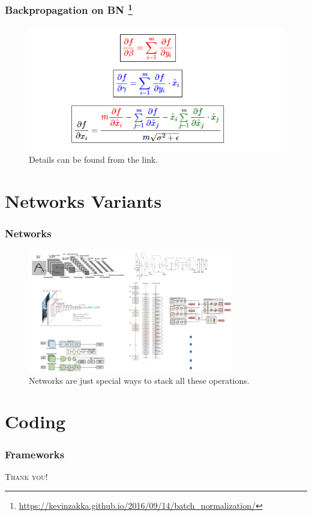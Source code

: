 \documentclass[10pt]{beamer}
\begin{document}
\begin{frame}
\frametitle{Backpropagation on BN \footnote{\url{https://kevinzakka.github.io/2016/09/14/batch_normalization/}}}
\begin{figure}[H]
	\centerline{
		\includegraphics[width=1\textwidth]{back_bn_2.png}
	}
\caption{Details can be found from the link.}
\end{figure}
\end{frame}















\section{Networks Variants}
\begin{frame}
\frametitle{Networks}
	\begin{figure}[H]
	\centerline{
		\includegraphics[width=0.8\textwidth]{networks.png}
	}
	\caption{Networks are just special ways to stack all these operations.}
\end{figure}
\end{frame}

\section{Coding}
\begin{frame}
\frametitle{Frameworks}
\end{frame}

\begin{frame}
	\begin{center}
		{\textcolor[rgb]{1 0 0}{\Huge\textsc{Thank you!}}}\bigskip
	\end{center}
\end{frame}
\end{document}
